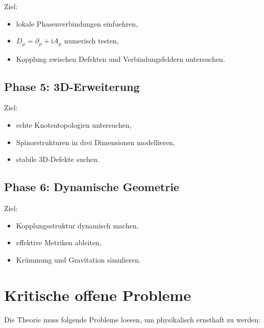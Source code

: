 \documentclass[11pt,a4paper]{article}
\newcommand{\ii}{\mathrm{i}}
\begin{document}
Ziel:
\begin{itemize}
  \item lokale Phasenverbindungen einfuehren,
  \item $D_\mu=\partial_\mu+\ii A_\mu$ numerisch testen,
  \item Kopplung zwischen Defekten und Verbindungsfeldern untersuchen.
\end{itemize}

\subsection{Phase 5: 3D-Erweiterung}

Ziel:
\begin{itemize}
  \item echte Knotentopologien untersuchen,
  \item Spinorstrukturen in drei Dimensionen modellieren,
  \item stabile 3D-Defekte suchen.
\end{itemize}

\subsection{Phase 6: Dynamische Geometrie}

Ziel:
\begin{itemize}
  \item Kopplungsstruktur dynamisch machen,
  \item effektive Metriken ableiten,
  \item Krümmung und Gravitation simulieren.
\end{itemize}

\section{Kritische offene Probleme}

Die Theorie muss folgende Probleme loesen, um physikalisch ernsthaft zu werden:
\end{document}
